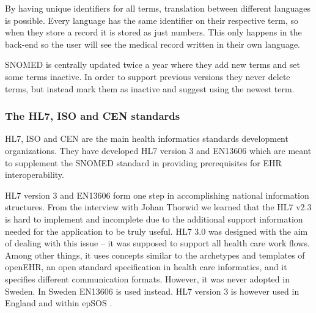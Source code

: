 \documentclass[14pt]{article}
\begin{document}
By having unique identifiers for all terms, translation between different languages is possible. Every language has the same identifier on their respective term, so when they store a record it is stored as just numbers. This only happens in the back-end so the user will see the medical record written in their own language.

\gls{SNOMED} is centrally updated twice a year where they add new terms and set some terms inactive. In order to support previous versions they never delete terms, but instead mark them as inactive and suggest using the newest term.\cite{annavik}

\subsubsection{The HL7, ISO and CEN standards}
\gls{HL7}, \gls{ISO} and \gls{CEN} are the main health informatics standards development organizations. They have developed \gls{HL7} version 3 and \gls{EN13606} which are meant to supplement the \gls{SNOMED} standard in providing prerequisites for \gls{EHR} \gls{interoperability}.

\gls{HL7} version 3 and \gls{EN13606} form one step in accomplishing national information structures. From the interview with Johan Thorwid \cite{Cambio} we learned that the \gls{HL7} v2.3 is hard to implement and incomplete due to the additional support information needed for the application to be truly useful. \gls{HL7} 3.0 was designed with the aim of dealing with this issue – it was supposed to support all health care work flows. Among other things, it uses concepts similar to the archetypes and templates of \gls{openEHR}, an open standard specification in health care informatics, and it specifies different communication formats. However, it was never adopted in Sweden. In Sweden \gls{EN13606} is used instead. \gls{HL7} version 3 is however used in England \cite{Cambio} and within epSOS \cite{epSOS}.
\end{document}
